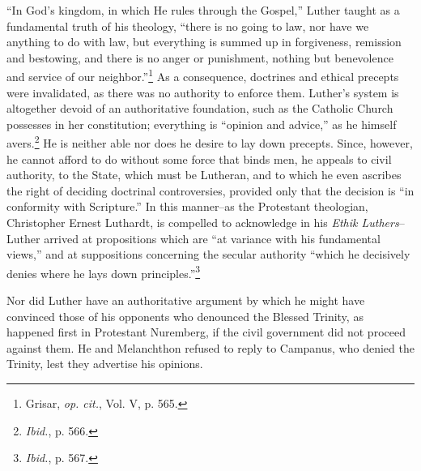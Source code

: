 “In God’s kingdom, in which He rules through the Gospel,” Luther taught
as a fundamental truth of his theology, “there is no going
to law, nor have we anything to do with law, but everything is
summed up in forgiveness, remission and bestowing, and there is no
anger or punishment, nothing but benevolence and service of our
neighbor.”\footnote{Grisar, \textit{op. cit.}, Vol. V, p. 565.}
 As a consequence, doctrines and ethical precepts were
invalidated, as there was no authority to enforce them. Luther’s system
is altogether devoid of an authoritative foundation, such as the
Catholic Church possesses in her constitution; everything is “opinion
and advice,” as he himself avers.\footnote{\textit{Ibid.}, p. 566.}
 He is neither able nor does he desire
to lay down precepts. Since, however, he cannot afford to do without
some force that binds men, he appeals to civil authority, to the State,
which must be Lutheran, and to which he even ascribes the right of
deciding doctrinal controversies, provided only that the decision is
“in conformity with Scripture.” In this manner--as the Protestant
theologian, Christopher Ernest Luthardt, is compelled to acknowledge
in his \textit{Ethik Luthers}--Luther arrived at propositions which are “at
variance with his fundamental views,” and at suppositions concerning the
secular authority “which he decisively denies where he lays
down principles.”\footnote{\textit{Ibid.}, p. 567.}

Nor did Luther have an authoritative argument by which he might
have convinced those of his opponents who denounced the Blessed
Trinity, as happened first in Protestant Nuremberg, if the civil government
did not proceed against them. He and Melanchthon refused
to reply to Campanus, who denied the Trinity, lest they advertise his
opinions.

